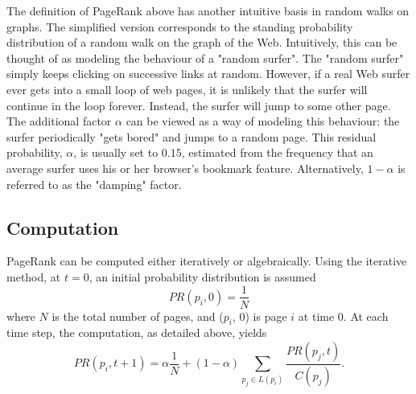 \documentclass[11pt,a4paper]{article}
\begin{document}
The definition of PageRank above has another intuitive basis in random walks on graphs. The simplified version corresponds to the standing probability distribution of a random walk on the graph of the Web. Intuitively, this can be thought of as modeling the behaviour of a "random surfer". The "random surfer" simply keeps clicking on successive links at random. However, if a real Web surfer ever gets into a small loop of web pages, it is unlikely that the surfer will continue in the loop forever. Instead, the surfer will jump to some other page. The additional factor $\alpha$ can be viewed as a way of modeling this behaviour: the surfer periodically "gets bored" and jumps to a random page.  This residual probability, $\alpha$, is usually set to $0.15$, estimated from the frequency that an average surfer uses his or her browser's bookmark feature. Alternatively, $1 - \alpha$ is referred to as the "damping" factor.
\subsection{Computation}
PageRank can be computed either iteratively or algebraically. Using the iterative method, at $t = 0$, an initial probability distribution is assumed
$$PR(p_i, 0) = \frac{1}{N}$$
where $N$ is the total number of pages, and ($p_i$, $0$) is page $i$ at time $0$. At each time step, the computation, as detailed above, yields
$$PR(p_i, t + 1) = \alpha \frac{1}{N} + (1 - \alpha) \sum_{p_j \in L(p_i)}\frac{PR(p_j, t)}{C(p_j)} .$$
\end{document}

